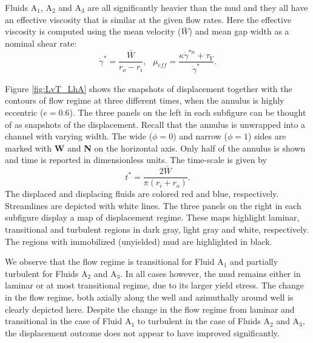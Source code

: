 \documentclass[review]{elsarticle}
\begin{document}
Fluids A$_1$, A$_2$ and A$_3$ are all significantly heavier than the mud and they all have an effective viscosity that is similar at the given flow rates. Here the effective viscosity is computed using the mean velocity (${\bar W}$) and mean gap width as a nominal shear rate:
\begin{equation}\label{eq:nominal_gamma}
	 {\dot\gamma}^* = \frac{ {\bar W}}{ r_o -  r_i}, ~~~  \mu_{eff} = \frac{ \kappa  {\dot\gamma}^{*n} +  \tau_Y}{ {\dot\gamma}^* }.
\end{equation}

Figure \ref{fig:LvT_LhA} shows the snapshots of displacement together with the contours of flow regime at three different times, when the annulus is highly eccentric ($e=0.6$). The three panels on the left in each subfigure can be thought of as snapshots of the displacement. Recall that the annulus is unwrapped into a channel with varying width. The wide ($\phi=0$) and narrow ($\phi=1$) sides are marked with \textbf{W} and \textbf{N} on the horizontal axis. Only half of the annulus is shown and time is reported in dimensionless units. The time-scale is given by
\[ t^* = \frac{2{\bar W}}{\pi(r_i+r_o)}.\]
The displaced and displacing fluids are colored red and blue, respectively. Streamlines are depicted with white lines.  The three panels on the right in each subfigure display a map of displacement regime. These maps highlight laminar, transitional and turbulent regions in dark gray, light gray and white, respectively. The regions with immobilized (unyielded) mud are highlighted in black.

We observe that the flow regime is transitional for Fluid A$_1$ and partially turbulent for Fluids A$_2$ and A$_3$. In all cases however, the mud remains either in laminar or at most transitional regime, due to its larger yield stress. The change in the flow regime, both axially along the well and azimuthally around well is clearly depicted here. Despite the change in the flow regime from laminar and transitional in the case of Fluid A$_1$ to turbulent in the case of Fluids A$_2$ and A$_3$, the displacement outcome does not appear to have improved significantly.
\end{document}
